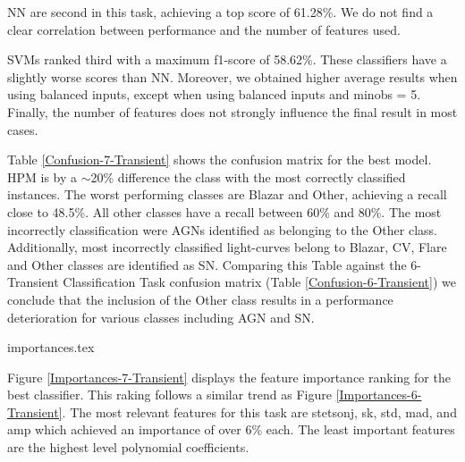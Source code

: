 \documentclass[a4paper,fleqn,usenatbib]{mnras}
\begin{document}
NN are second in this task, achieving a top score of 61.28\%.  
We do not find a clear correlation between performance and the number
of features used. 


SVMs ranked third with a maximum f1-score of 58.62\%. 
These classifiers have a slightly worse scores than NN.
Moreover, we obtained higher average results when using balanced inputs,
except when using balanced inputs and min\textunderscore obs = 5.
Finally, the number of features does not strongly influence the final
result in most cases.

Table \ref{Confusion-7-Transient} shows the confusion matrix for the
best model. 
HPM is by a $\sim$20\% difference the class with the most correctly
classified instances.  
The worst performing classes are Blazar and Other, achieving a recall
close to 48.5\%. 
All other classes have a recall between 60\% and 80\%. 
The most incorrectly classification were AGNs identified as belonging
to the Other class. 
Additionally, most incorrectly classified light-curves belong to Blazar, CV, Flare and
Other classes are identified as SN. 
Comparing this Table against the  6-Transient Classification Task confusion matrix (Table
\ref{Confusion-6-Transient}) we conclude that the inclusion of the
Other class results in a performance deterioration for various classes
including AGN and SN.   



{importances.tex}

Figure \ref{Importances-7-Transient} displays the feature importance
ranking for the best classifier.
This raking follows a similar trend as Figure \ref{Importances-6-Transient}. 
The most relevant features for this task are stetson\textunderscore j,
sk, std, mad, and amp which achieved an importance of over 6\% each. 
The least important features are the highest level polynomial
coefficients.


\end{document}
